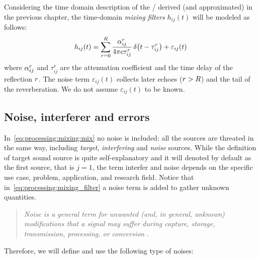 Considering the time domain description of the \RIR/ derived (and approximated) in the previous chapter,
the time-domain \emph{mixing filters} $h_{ij}( t)$ will be modeled as follows:
\begin{equation}\label{eq:processing:mixing_filter}
    h_{ij}( t) = \sum_{\idxEch=0}^{\numEchs} \frac{\absCoeff_{ij}^r}{4 \pi \speedOfSound \tau_{ij}^r}
                       \diracOf{t - \tau_{ij}^r} + \varepsilon_{ij}(t)
\end{equation}
where $\alpha_{ij}^r$ and $\tau_{ij}^r$ are the attenuation coefficient and the time delay of the reflection $r$.
The noise term $\varepsilon_{ij}( t)$ collects later echoes ($r > R$) and the tail of the reverberation.
We do not assume $\varepsilon_{ij}( t)$ to be known.

\subsection{Noise, interferer and errors}
In~\cref{eq:processing:mixing:mix} no noise is included:
all the sources are threated in the same way, including \textit{target}, \textit{interfering} and \textit{noise} sources.
While the definition of target sound source is quite self-explanatory and it will denoted by default as the first source, that is $j = 1$,
the term interfer and noise depends on the specific use case, problem, application, and research field.
Notice that in~\cref{eq:processing:mixing_filter} a noise term is added to gather unknown quantities.
\begin{quote}
    \textit{\emph{Noise} is a general term for unwanted (and, in general, unknown) modifications that a signal may suffer during capture, storage, transmission, processing, or conversion}
    .
\end{quote}
Therefore, we will define and use the following type of noises:
